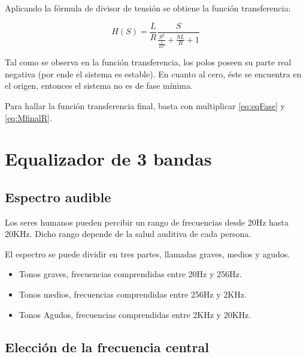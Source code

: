 \documentclass[../../tc_tp3_main.tex]{subfiles}
\begin{document}
Aplicando la f\'ormula de divisor de tensi\'on se obtiene la funci\'on transferencia:

\begin{equation}
H(S)=\frac{L}{R}\frac{S}{\frac{S^2}{\frac{1}{LC}}+\frac{SL}{R} +1}\label{eq:eqFase}
\end{equation}

Tal como se observa en la función transferencia, los polos poseen su parte real negativa (por ende el sistema es estable). En cuanto al cero, \'este se encuentra en el origen, entonces el sistema no es de fase mínima.
\par
Para hallar la función transferencia final, basta con multiplicar \ref{eq:eqFase} y \ref{eq:MfinalR}.
















\section{Equalizador de 3 bandas}

\subsection{Espectro audible}
Los seres humanos pueden percibir un rango de frecuencias desde 20Hz hasta 20KHz. Dicho rango depende de la salud auditiva de cada persona.
\par 
 El espectro se puede dividir en tres partes, llamadas graves, medios y agudos.

\begin{itemize}
  \item Tonos graves, frecuencias comprendidas entre 20Hz y 256Hz.
  \item Tonos medios, frecuencias comprendidas entre 256Hz y 2KHz.
  \item Tonos Agudos, frecuencias comprendidas entre 2KHz y 20KHz.
\end{itemize}
\subsection{Elección de la frecuencia central}
\end{document}

